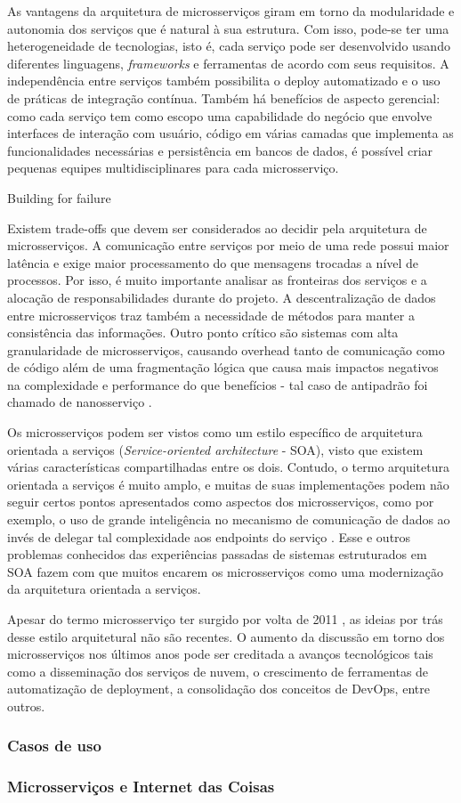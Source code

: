 As vantagens da arquitetura de microsserviços giram em torno da modularidade e autonomia dos serviços que é natural à sua estrutura. Com isso, pode-se ter uma heterogeneidade de tecnologias, isto é, cada serviço pode ser desenvolvido usando diferentes linguagens, \textit{frameworks} e ferramentas de acordo com seus requisitos. A independência entre serviços também possibilita o deploy automatizado e o uso de práticas de integração contínua. Também há benefícios de aspecto gerencial: como cada serviço tem como escopo uma capabilidade do negócio que envolve interfaces de interação com usuário, código em várias camadas que implementa as funcionalidades necessárias e persistência em bancos de dados, é possível criar pequenas equipes multidisciplinares para cada microsserviço.

Building for failure %

Existem trade-offs que devem ser considerados ao decidir pela arquitetura de microsserviços. A comunicação entre serviços por meio de uma rede possui maior latência e exige maior processamento do que mensagens trocadas a nível de processos. Por isso, é muito importante analisar as fronteiras dos serviços e a alocação de responsabilidades durante do projeto. A descentralização de dados entre microsserviços traz também a necessidade de métodos para manter a consistência das informações. Outro ponto crítico são sistemas com alta granularidade de microsserviços, causando overhead tanto de comunicação como de código além de uma fragmentação lógica que causa mais impactos negativos na complexidade e performance do que benefícios - tal caso de antipadrão foi chamado de nanosserviço \cite{rotem}.

Os microsserviços podem ser vistos como um estilo específico de arquitetura orientada a serviços (\textit{Service-oriented architecture} - SOA), visto que existem várias características compartilhadas entre os dois. Contudo, o termo arquitetura orientada a serviços é muito amplo, e muitas de suas implementações podem não seguir certos pontos apresentados como aspectos dos microsserviços, como por exemplo, o uso de grande inteligência no mecanismo de comunicação de dados ao invés de delegar tal complexidade aos endpoints do serviço \cite{james}. Esse e outros problemas conhecidos das experiências passadas de sistemas estruturados em SOA fazem com que muitos encarem os microsserviços como uma modernização da arquitetura orientada a serviços.

Apesar do termo microsserviço ter surgido por volta de 2011 \cite{james}, as ideias por trás desse estilo arquitetural não são recentes. O aumento da discussão em torno dos microsserviços nos últimos anos pode ser creditada a avanços tecnológicos tais como a disseminação dos serviços de nuvem, o crescimento de ferramentas de automatização de deployment, a consolidação dos conceitos de DevOps, entre outros.

\subsubsection{Casos de uso} %

\subsubsection{Microsserviços e Internet das Coisas} %
